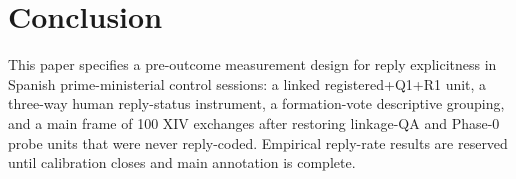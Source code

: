 \section{Conclusion}
\label{sec:conclusion}

This paper specifies a pre-outcome measurement design for reply explicitness in
Spanish prime-ministerial control sessions: a linked registered+Q1+R1 unit, a
three-way human reply-status instrument, a formation-vote descriptive grouping,
and a main frame of 100 XIV exchanges after restoring linkage-QA and Phase-0
probe units that were never reply-coded. Empirical reply-rate results are
reserved until calibration closes and main annotation is complete.
